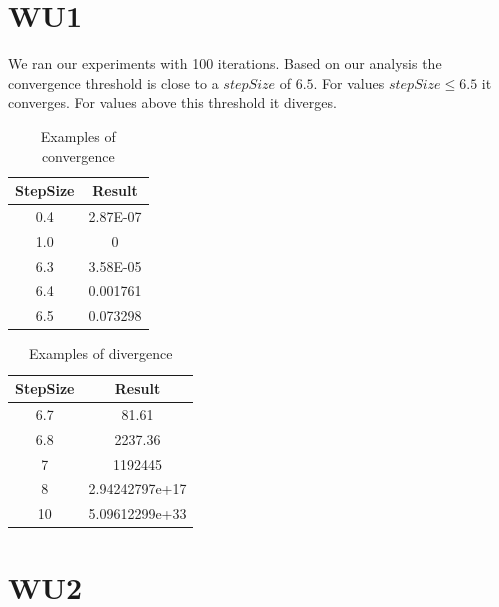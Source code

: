 \section{WU1}

We ran our experiments with 100 iterations. Based on our analysis the convergence threshold is close to a $stepSize$ of $6.5$. For values $stepSize \le 6.5$ it converges. 
For values above this threshold it diverges.

\begin{table}[ht]
	\centering %
	\begin{tabular}{c c} %
		\hline\hline %
		StepSize & Result \\ [0.5ex] %
		\hline %
		0.4 & 2.87E-07 \\ %
		1.0 & 0 \\
		6.3 & 3.58E-05 \\
		6.4 & 0.001761 \\
		6.5 & 0.073298 \\ [1ex] %
		\hline %
	\end{tabular}
	\label{table:convergence} %
	\caption{Examples of convergence} %
\end{table}



\begin{table}[ht]
\centering %
\begin{tabular}{c c} %
\hline\hline %
StepSize & Result \\ [0.5ex] %
\hline %
6.7 & 81.61 \\ %
6.8 & 2237.36 \\
7 & 1192445 \\
8 & 2.94242797e+17 \\
10 & 5.09612299e+33 \\ [1ex] %
\hline %
\end{tabular}
\label{table:divergence} %
\caption{Examples of divergence} %
\end{table}

\section{WU2}

